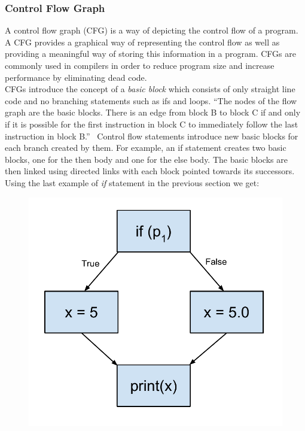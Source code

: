 \documentclass[12pt, titlepage]{article}
\begin{document}
\subsubsection{Control Flow Graph}
A control flow graph (CFG) is a way of depicting the control flow of a program. A CFG provides a graphical way of representing the control flow as well as providing a meaningful way of storing this information in a program. CFGs are commonly used in compilers in order to reduce program size and increase performance by eliminating dead code. \\
CFGs introduce the concept of a \textit{basic block} which consists of only straight line code and no branching statements such as ifs and loops. ``The nodes of the flow 
graph are the basic blocks. There is an edge from block B to block C if and 
only if it is possible for the first instruction in block C to immediately follow 
the last instruction in block B.''~\cite{dragonBook} Control flow statements introduce new basic blocks for each branch created by them. For example, an if statement creates two basic blocks, one for the then body and one for the else body. The basic blocks are then linked using directed links with each block pointed towards its successors. \\
Using the last example of \textit{if} statement in the previous section we get:
\begin{figure}[h]
\centering
\includegraphics[scale=0.4]{images/controlFlowGraph.pdf}
\end{figure}  \\
\end{document}

